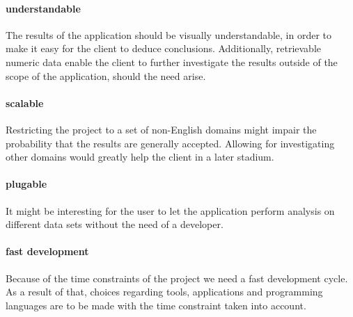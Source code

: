\paragraph{understandable} The results of the application should be visually understandable, in order to make it easy for the client to deduce conclusions. Additionally, retrievable numeric data enable the client to further investigate the results outside of the scope of the application, should the need arise.
\paragraph{scalable} Restricting the project to a set of non-English domains might impair the probability that the results are generally accepted. Allowing for investigating other domains would greatly help the client in a later stadium.
\paragraph{plugable} It might be interesting for the user to let the application perform analysis on different data sets without the need of a developer. 
\paragraph{fast development} Because of the time constraints of the project we need a fast development cycle. As a result of that, choices regarding tools, applications and programming languages are to be made with the time constraint taken into account.

